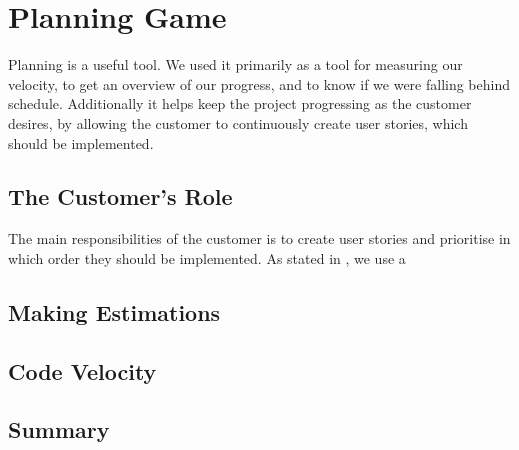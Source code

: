 \section{Planning Game}
Planning is a useful tool.
We used it primarily as a tool for measuring our velocity, to get an overview of our progress, and to know if we were falling behind schedule.
Additionally it helps keep the project progressing as the customer desires, by allowing the customer to continuously create user stories, which should be implemented.

\subsection{The Customer's Role}
The main responsibilities of the customer is to create user stories and prioritise in which order they should be implemented.
As stated in \Cref{}, we use a 

\subsection{Making Estimations}

\subsection{Code Velocity}

\subsection{Summary}
